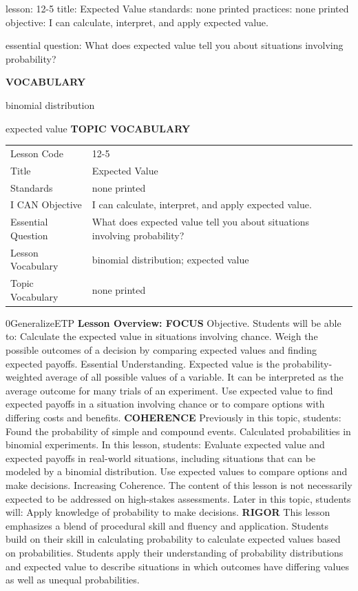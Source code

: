 \documentclass{article}
\newenvironment{lesson-meta}{}{}        %
\newenvironment{te-addendum}[2]{}{}     %
\newcommand{\te}[1]{}                   %
\begin{document}
\begin{lesson-meta}
lesson: 12-5
title: Expected Value
standards: none printed
practices: none printed
objective: I can calculate, interpret, and apply expected value.

essential question: What does expected value tell you about situations involving probability?

\textbf{VOCABULARY}
\item binomial distribution
\item expected value
\textbf{TOPIC VOCABULARY}
\te{No topic vocabulary list is printed on these lesson pages.}
\begin{tabular}{ll}
Lesson Code & 12-5 \\
Title & Expected Value \\
Standards & none printed \\
I CAN Objective & I can calculate, interpret, and apply expected value. \\
Essential Question & What does expected value tell you about situations involving probability? \\
Lesson Vocabulary & binomial distribution; expected value \\
Topic Vocabulary & none printed \\
\end{tabular}
\end{lesson-meta}
\begin{te-addendum}{0}{GeneralizeETP}
\textbf{Lesson Overview: FOCUS}
Objective. Students will be able to:
Calculate the expected value in situations involving chance.
Weigh the possible outcomes of a decision by comparing expected values and finding expected payoffs.
Essential Understanding. Expected value is the probability-weighted average of all possible values of a variable. It can be interpreted as the average outcome for many trials of an experiment. Use expected value to find expected payoffs in a situation involving chance or to compare options with differing costs and benefits.
\textbf{COHERENCE}
Previously in this topic, students: Found the probability of simple and compound events. Calculated probabilities in binomial experiments.
In this lesson, students: Evaluate expected value and expected payoffs in real-world situations, including situations that can be modeled by a binomial distribution. Use expected values to compare options and make decisions.
Increasing Coherence. The content of this lesson is not necessarily expected to be addressed on high-stakes assessments.
Later in this topic, students will: Apply knowledge of probability to make decisions.
\textbf{RIGOR}
This lesson emphasizes a blend of procedural skill and fluency and application.
Students build on their skill in calculating probability to calculate expected values based on probabilities.
Students apply their understanding of probability distributions and expected value to describe situations in which outcomes have differing values as well as unequal probabilities.
\end{te-addendum}
\end{document}
